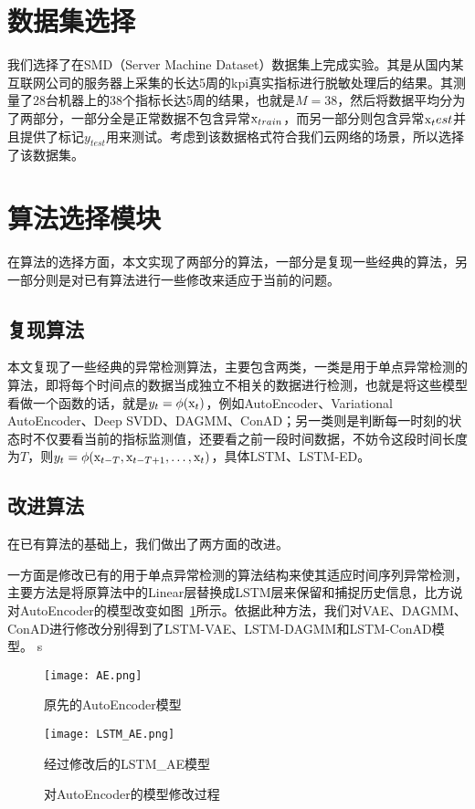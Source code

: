 \section{数据集选择}
我们选择了在SMD（Server Machine Dataset）\cite{su2019robust}数据集上完成实验。其是从国内某互联网公司的服务器上采集的长达5周的kpi真实指标进行脱敏处理后的结果。其测量了28台机器上的38个指标长达5周的结果，也就是$M=38$，然后将数据平均分为了两部分，一部分全是正常数据不包含异常${\rm x}_{train}$，而另一部分则包含异常${\rm x}_test$并且提供了标记$y_{test}$用来测试。考虑到该数据格式符合我们云网络的场景，所以选择了该数据集。

\section{算法选择模块}
在算法的选择方面，本文实现了两部分的算法，一部分是复现一些经典的算法，另一部分则是对已有算法进行一些修改来适应于当前的问题。
\subsection{复现算法}
本文复现了一些经典的异常检测算法，主要包含两类，一类是用于单点异常检测的算法，即将每个时间点的数据当成独立不相关的数据进行检测，也就是将这些模型看做一个函数的话，就是$y_t = \phi ({\rm x}_t)$，例如AutoEncoder、Variational AutoEncoder\cite{an2015variational}、Deep SVDD\cite{ruff2018deep}、DAGMM\cite{zong2018deep}、ConAD\cite{nguyen2018anomaly}；另一类则是判断每一时刻的状态时不仅要看当前的指标监测值，还要看之前一段时间数据，不妨令这段时间长度为$T$，则$y_t = \phi({\rm x}_{t-T},{\rm x}_{t-T+1},\dots,{\rm x}_{t})$，具体LSTM、LSTM-ED\cite{malhotra2016lstm}。
\subsection{改进算法}
在已有算法的基础上，我们做出了两方面的改进。

一方面是修改已有的用于单点异常检测的算法结构来使其适应时间序列异常检测，主要方法是将原算法中的Linear层替换成LSTM层来保留和捕捉历史信息，比方说对AutoEncoder的模型改变如图~\ref{fig:lstm_ae}所示。依据此种方法，我们对VAE、DAGMM、ConAD进行修改分别得到了LSTM-VAE、LSTM-DAGMM和LSTM-ConAD模型。
s
\begin{figure}[htbp]
  \begin{minipage}[t]{0.5\linewidth}
  \centering
  \texttt{[image: AE.png]}
  \caption*{原先的AutoEncoder模型}
  \end{minipage}
  \begin{minipage}[t]{0.5\linewidth}
  \centering
  \texttt{[image: LSTM\_AE.png]}
  \caption*{经过修改后的LSTM\_AE模型}
  \end{minipage}
  \caption{对AutoEncoder的模型修改过程}
  \label{fig:lstm_ae}
\end{figure}

